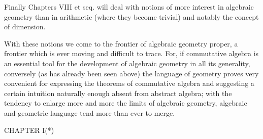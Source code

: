 Finally Chapters VIII et seq. will deal with notions of more interest in algebraic geometry than in arithmetic (where they become trivial) and notably the concept of dimension.

With these notions we come to the frontier of algebraic geometry proper, a frontier which is ever moving and difficult to trace. For, if commutative algebra is an essential tool for the development of algebraic geometry in all its generality, conversely (as has already been seen above) the language of geometry proves very convenient for expressing the theorems of commutative algebra and suggesting a certain intuition naturally enough absent from abstract algebra; with the tendency to enlarge more and more the limits of algebraic geometry, algebraic and geometric language tend more than ever to merge.

CHAPTER I(*)

